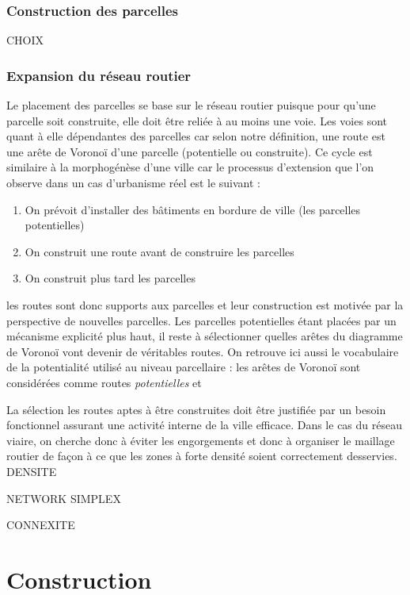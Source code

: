 \documentclass[12pt]{article}
\begin{document}
\subsubsection{Construction des parcelles}

CHOIX

\subsubsection{Expansion du réseau routier}

Le placement des parcelles se base sur le réseau routier puisque pour
qu'une parcelle soit construite, elle doit être reliée à au moins une
voie. Les voies sont quant à elle dépendantes des parcelles car selon
notre définition, une route est une arête de Voronoï d'une parcelle
(potentielle ou construite). Ce cycle est similaire à la morphogénèse
d'une ville car le processus d'extension que l'on observe dans un cas
d'urbanisme réel est le suivant :

\begin{enumerate}
\item{On prévoit d'installer des bâtiments en bordure de ville (les
  parcelles potentielles)}
\item{On construit une route avant de construire les parcelles}
\item{On construit plus tard les parcelles}
\end{enumerate}

les routes sont donc supports aux parcelles et leur construction est
motivée par la perspective de nouvelles parcelles. Les parcelles
potentielles étant placées par un mécanisme explicité plus haut, il
reste à sélectionner quelles arêtes du diagramme de Voronoï vont
devenir de véritables routes. On retrouve ici aussi le vocabulaire de
la potentialité utilisé au niveau parcellaire : les arêtes de Voronoï
sont considérées comme routes \textit{potentielles} et

La sélection les routes aptes à être construites doit être justifiée
par un besoin fonctionnel assurant une activité interne de la ville
efficace. Dans le cas du réseau viaire, on cherche donc à éviter les
engorgements et donc à organiser le maillage routier de façon à ce que
les zones à forte densité soient correctement desservies. DENSITE

NETWORK SIMPLEX

CONNEXITE

\section{Construction}
\end{document}
